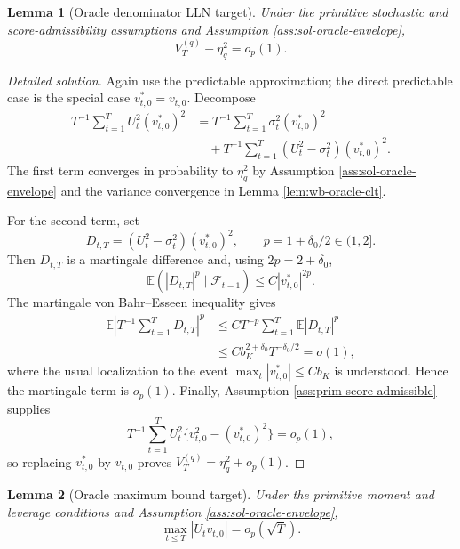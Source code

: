 \documentclass[12pt]{article}
\numberwithin{equation}{section}
\newtheorem{lemma}{Lemma}
\theoremstyle{definition}
\newcommand{\E}{\mathbb E}
\begin{document}
\begin{lemma}[Oracle denominator LLN target]
\label{lem:wb-oracle-lln}
Under the primitive stochastic and score-admissibility assumptions and
Assumption \ref{ass:sol-oracle-envelope},
\[
    V_T^{(q)}-\eta_q^2=o_p(1).
\]
\end{lemma}


\begin{proof}[Detailed solution]
Again use the predictable approximation; the direct predictable case is the
special case \(v_{t,0}^\ast=v_{t,0}\).  Decompose
\begin{align*}
    T^{-1}\sum_{t=1}^TU_t^2(v_{t,0}^\ast)^2
    &=T^{-1}\sum_{t=1}^T\sigma_t^2(v_{t,0}^\ast)^2\\
    &\quad+T^{-1}\sum_{t=1}^T
       (U_t^2-\sigma_t^2)(v_{t,0}^\ast)^2.
\end{align*}
The first term converges in probability to \(\eta_q^2\) by Assumption
\ref{ass:sol-oracle-envelope} and the variance convergence in Lemma
\ref{lem:wb-oracle-clt}.

For the second term, set
\[
    D_{t,T}=(U_t^2-\sigma_t^2)(v_{t,0}^\ast)^2,
    \qquad p=1+\delta_0/2\in(1,2].
\]
Then \(D_{t,T}\) is a martingale difference and, using
\(2p=2+\delta_0\),
\[
    \E(|D_{t,T}|^p\mid\mathcal F_{t-1})
    \leq C|v_{t,0}^\ast|^{2p}.
\]
The martingale von Bahr--Esseen inequality gives
\begin{align*}
    \E\left|
      T^{-1}\sum_{t=1}^TD_{t,T}
    \right|^p
    &\leq C T^{-p}\sum_{t=1}^T\E|D_{t,T}|^p\\
    &\leq C b_K^{2+\delta_0}T^{-\delta_0/2}=o(1),
\end{align*}
where the usual localization to the event
\(\max_t|v_{t,0}^\ast|\leq Cb_K\) is understood.  Hence the martingale term is
\(o_p(1)\).  Finally, Assumption \ref{ass:prim-score-admissible} supplies
\[
    T^{-1}\sum_{t=1}^TU_t^2
       \{v_{t,0}^2-(v_{t,0}^\ast)^2\}=o_p(1),
\]
so replacing \(v_{t,0}^\ast\) by \(v_{t,0}\) proves
\(V_T^{(q)}=\eta_q^2+o_p(1)\).
\end{proof}


\begin{lemma}[Oracle maximum bound target]
\label{lem:wb-oracle-max}
Under the primitive moment and leverage conditions and Assumption
\ref{ass:sol-oracle-envelope},
\[
    \max_{t\leq T}|U_tv_{t,0}|=o_p(\sqrt T).
\]
\end{lemma}
\end{document}
